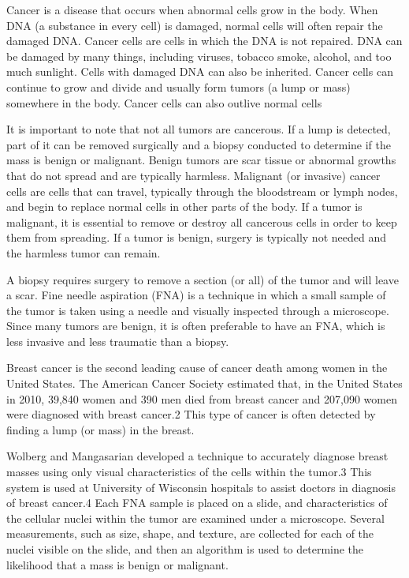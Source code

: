 \documentclass[
]{report}
\begin{document}
Cancer is a disease that occurs when abnormal cells grow in the body. When DNA (a substance in every
cell) is damaged, normal cells will often repair the damaged DNA. Cancer cells are cells in which the
DNA is not repaired. DNA can be damaged by many things, including viruses, tobacco smoke, alcohol, and too much sunlight. Cells with damaged DNA can also be inherited. Cancer cells can continue to grow and divide and usually form tumors (a lump or mass) somewhere in the body. Cancer cells can also outlive normal cells

It is important to note that not all tumors are cancerous. If a lump is detected, part of it can be removed surgically and a biopsy conducted to determine if the mass is benign or malignant. Benign tumors are scar tissue or abnormal growths that do not spread and are typically harmless. Malignant (or invasive) cancer cells are cells that can travel, typically through the bloodstream or lymph nodes, and begin to replace normal cells in other parts of the body. If a tumor is malignant, it is essential to remove or destroy all cancerous cells in order to keep them from spreading. If a tumor is benign, surgery is typically not needed and the harmless tumor can remain.

A biopsy requires surgery to remove a section (or all) of the tumor and will leave a scar. Fine needle aspiration (FNA) is a technique in which a small sample of the tumor is taken using a needle and visually inspected through a microscope. Since many tumors are benign, it is often preferable to have an FNA, which is less invasive and less traumatic than a biopsy.

Breast cancer is the second leading cause of cancer death among women in the United States. The American Cancer Society estimated that, in the United States in 2010, 39,840 women and 390 men died from breast cancer and 207,090 women were diagnosed with breast cancer.2 This type of cancer is often detected by finding a lump (or mass) in the breast.

Wolberg and Mangasarian developed a technique to accurately diagnose breast masses using only visual characteristics of the cells within the tumor.3 This system is used at University of Wisconsin hospitals to assist doctors in diagnosis of breast cancer.4 Each FNA sample is placed on a slide, and characteristics of the cellular nuclei within the tumor are examined under a microscope. Several measurements, such as size, shape, and texture, are collected for each of the nuclei visible on the slide, and then an algorithm is used to determine the likelihood that a mass is benign or malignant.
\end{document}
